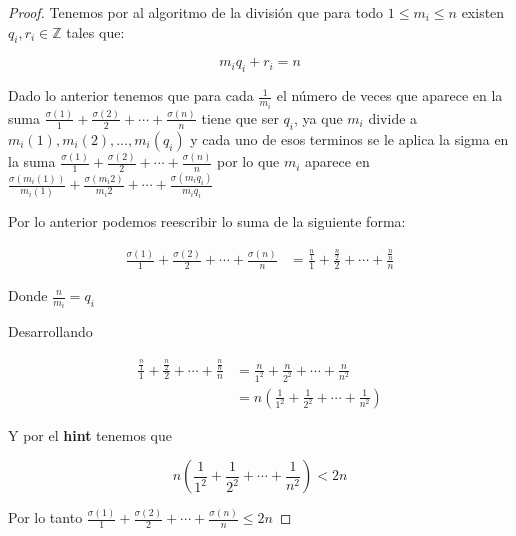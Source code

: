 \documentclass[12pt]{article}
\begin{document}
\begin{enumerate}
\begin{proof}
    Tenemos por al algoritmo de la división que para todo $ 1 \leq m_i \leq n$ existen $q_i, r_i \in \mathbb{Z}$ tales que:
    
    \begin{equation}
        m_iq_i + r_i = n
    \end{equation}
    
    Dado lo anterior tenemos que para cada $\frac{1}{m_i}$ el número de veces que aparece en la suma $\frac{\sigma(1)}{1}+\frac{\sigma(2)}{2}+\cdots+\frac{\sigma(n)}{n}$ tiene que ser 
    $q_i$, ya que $m_i$ divide a $m_i(1), m_i(2), \dots , m_i(q_i)$ y cada uno de esos terminos se le aplica la sigma en la suma $\frac{\sigma(1)}{1}+\frac{\sigma(2)}{2}+\cdots+\frac{\sigma(n)}{n}$ por lo que $m_i$ aparece en $\frac{\sigma(m_i(1))}{m_i(1)}+\frac{\sigma(m_i2)}{m_i2}+\cdots+\frac{\sigma(m_iq_i)}{m_iq_i}$
    
    Por lo anterior podemos reescribir lo suma de la siguiente forma:
    
    
    \begin{align*}
        \frac{\sigma(1)}{1}+\frac{\sigma(2)}{2}+\cdots+\frac{\sigma(n)}{n} &= \frac{\frac{n}{1}}{1}+\frac{\frac{n}{2}}{2}+\cdots+\frac{\frac{n}{n}}{n}
    \end{align*}
    
    Donde $\frac{n}{m_i} = q_i$
    
    Desarrollando 
    
    \begin{align*}
        \frac{\frac{n}{1}}{1}+\frac{\frac{n}{2}}{2}+\cdots+\frac{\frac{n}{n}}{n} &= 
        \frac{n}{1^2}+\frac{n}{2^2}+\cdots+\frac{n}{n^2} \\
        &=  n(\frac{1}{1^2}+\frac{1}{2^2}+\cdots+\frac{1}{n^2})
    \end{align*}
    
    Y por el \textbf{hint} tenemos que 
    
    \begin{equation*}
          n(\frac{1}{1^2}+\frac{1}{2^2}+\cdots+\frac{1}{n^2}) < 2n
    \end{equation*}
    
    Por lo tanto $\frac{\sigma(1)}{1}+\frac{\sigma(2)}{2}+\cdots+\frac{\sigma(n)}{n}\leq 2n$
    
    \end{proof}
    
\end{enumerate} 

    
\end{document}
